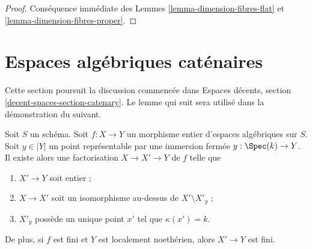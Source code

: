 \begin{proof}
Conséquence immédiate des
Lemmes \ref{lemma-dimension-fibres-flat} et
\ref{lemma-dimension-fibres-proper}.
\end{proof}





\section{Espaces algébriques caténaires}
\label{section-catenary}

\noindent
Cette section poursuit la discussion commencée dans
Espaces décents, section \ref{decent-spaces-section-catenary}.
Le lemme qui suit sera utilisé dans la démonstration du suivant.

\begin{lemma}
\label{lemma-construct-glueing}
Soit $S$ un schéma. Soit $f : X \to Y$ un morphisme entier
d'espaces algébriques sur $S$.
Soit $y \in |Y|$ un point représentable par une immersion fermée
$y : \Spec(k) \to Y$. Il existe alors
une factorisation $X \to X' \to Y$ de $f$ telle que
\begin{enumerate}
\item $X' \to Y$ soit entier ;
\item $X \to X'$ soit un isomorphisme au-dessus de $X' \setminus X'_y$ ;
\item $X'_y$ possède un unique point $x'$ tel que $\kappa(x') = k$.
\end{enumerate}
De plus, si $f$ est fini et $Y$ est localement noethérien, alors
$X' \to Y$ est fini.
\end{lemma}

